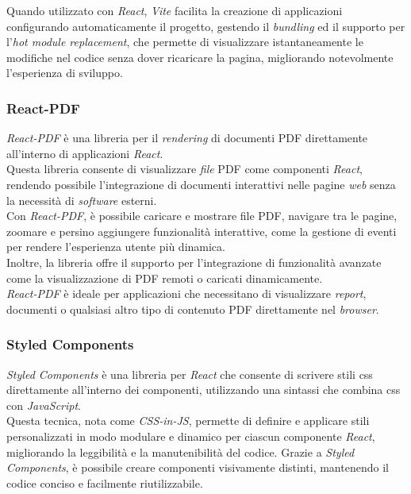 \noindent Quando utilizzato con \textit{React}, \textit{Vite} facilita la creazione di applicazioni configurando automaticamente il progetto, gestendo il \textit{bundling} ed il supporto per l'\textit{hot module replacement},
che permette di visualizzare istantaneamente le modifiche nel codice senza dover ricaricare la pagina, migliorando notevolmente l’esperienza di sviluppo.

\subsubsection{React-PDF}

\textit{React-PDF} è una libreria per il \textit{rendering} di documenti PDF direttamente all'interno di applicazioni \textit{React}. \\
Questa libreria consente di visualizzare \textit{file} PDF come componenti \textit{React}, rendendo possibile l'integrazione di documenti interattivi nelle pagine \textit{web} senza la necessità di \textit{software} esterni.\\

\noindent Con \textit{React-PDF}, è possibile caricare e mostrare file PDF, navigare tra le pagine, zoomare e persino aggiungere funzionalità interattive, come la gestione di eventi per rendere l’esperienza utente più dinamica. \\
Inoltre, la libreria offre il supporto per l’integrazione di funzionalità avanzate come la visualizzazione di PDF remoti o caricati dinamicamente.\\
\textit{React-PDF} è ideale per applicazioni che necessitano di visualizzare \textit{report}, documenti o qualsiasi altro tipo di contenuto PDF direttamente nel \textit{browser}.

\subsubsection{Styled Components}

\textit{Styled Components} è una libreria per \textit{React} che consente di scrivere stili \gls{css} direttamente all’interno dei componenti, utilizzando una sintassi che combina \gls{css} con \textit{JavaScript}.\\
Questa tecnica, nota come \textit{CSS-in-JS}, permette di definire e applicare stili personalizzati in modo modulare e dinamico per ciascun componente \textit{React}, migliorando la leggibilità e la manutenibilità del codice. 
Grazie a \textit{Styled Components}, è possibile creare componenti visivamente distinti, mantenendo il codice conciso e facilmente riutilizzabile.\\

